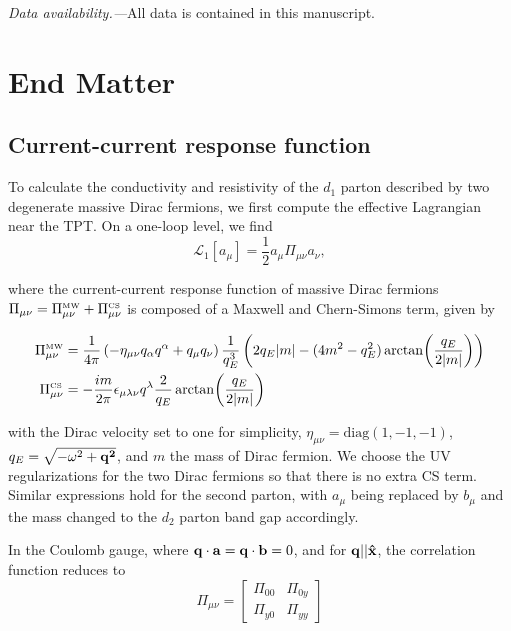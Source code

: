 \documentclass[aps,prl,twocolumn,superscriptaddress,floatfix, 10pt,longbibliography, nofootinbib]{revtex4-2}
\begin{document}
{\it{Data availability.---}}All data is contained in this manuscript.


\section{End Matter}
\subsection{Current-current response function}
To calculate the conductivity and resistivity of the $d_1$ parton described by two degenerate massive Dirac fermions, we first compute the effective Lagrangian near the TPT. On a one-loop level, we find
\begin{equation}
    \mathcal{L}_1[a_\mu]=\frac{1}{2}a_\mu\Pi_{\mu\nu} a_\nu, \label{LagrangianParton1}
\end{equation}



where the current-current response function of massive Dirac fermions $\Pi_{\mu \nu} = \Pi_{\mu\nu}^\text{\tiny MW} + \Pi_{\mu\nu}^\text{\tiny CS}$ is composed of a Maxwell and Chern-Simons term, given by
\begin{widetext}
\begin{equation}
\begin{aligned}
    \Pi_{\mu\nu}^\text{\tiny MW}&=\frac{1}{4\pi}\left(-\eta_{\mu\nu}q_\alpha q^\alpha+q_\mu q_\nu\right) \frac{1}{q_E^3}\left(2q_E\abs{m}-(4m^2-q_E^2) \arctan(\frac{q_E}{2\abs{m}})\right)\\
    \Pi_{\mu\nu}^\text{\tiny CS}&=-\frac{im}{2\pi}\epsilon_{\mu\lambda\nu}q^\lambda \frac{2}{q_E}\arctan(\frac{q_E}{2\abs{m}})
    \label{Pis}
\end{aligned}

\end{equation}
\end{widetext}
with the Dirac velocity set to one for simplicity, $\eta_{\mu\nu}=\text{diag}(1,-1,-1)$, $q_E=\sqrt{-\omega^2+\bf{q}^2}$, and $m$ the mass of Dirac fermion. We choose the UV regularizations for the two Dirac fermions so that there is no extra CS term. Similar expressions hold for the second parton, with $a_\mu$ being replaced by $b_\mu$ and the mass changed to the $d_2$ parton band gap accordingly.

In the Coulomb gauge, where ${\bf q}\cdot{\bf a}={\bf q}\cdot{\bf b}=0$, and for $\bf q||\hat{x}$, the correlation function reduces to
\begin{equation}
    \Pi_{\mu\nu}=\begin{bmatrix}
    \Pi_{00} & \Pi_{0y}\\
    \Pi_{y0} & \Pi_{yy}
    \label{twobytwoPi}
    \end{bmatrix}
\end{equation}
\end{document}
